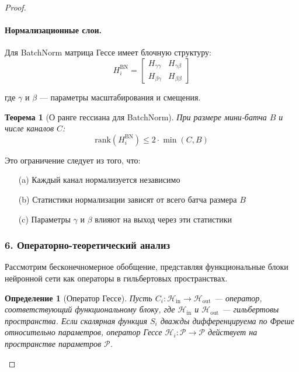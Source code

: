 \documentclass[a4paper,12pt]{article}
\newtheorem{theorem}{Теорема}
\newtheorem{definition}{Определение}
\begin{document}
\begin{proof}
    \paragraph{Нормализационные слои.}
    Для BatchNorm матрица Гессе имеет блочную структуру:
    \begin{equation}
    H_i^{\text{BN}} = 
    \begin{bmatrix}
    H_{\gamma\gamma} & H_{\gamma\beta} \\
    H_{\beta\gamma} & H_{\beta\beta}
    \end{bmatrix}
    \end{equation}
    
    где $\gamma$ и $\beta$ — параметры масштабирования и смещения.
    
    \begin{theorem}[О ранге гессиана для BatchNorm]
    При размере мини-батча $B$ и числе каналов $C$:
    \begin{equation}
    \text{rank}(H_i^{\text{BN}}) \leq 2 \cdot \min(C, B)
    \end{equation}
    \end{theorem}
    
    Это ограничение следует из того, что:
    \begin{enumerate}
    \item[(a)] Каждый канал нормализуется независимо
    \item[(b)] Статистики нормализации зависят от всего батча размера $B$
    \item[(c)] Параметры $\gamma$ и $\beta$ влияют на выход через эти статистики
    \end{enumerate}
    
    \subsubsection*{6. Операторно-теоретический анализ}
    
    Рассмотрим бесконечномерное обобщение, представляя функциональные блоки нейронной сети как операторы в гильбертовых пространствах.
    
    \begin{definition}[Оператор Гессе]
    Пусть $C_i: \mathcal{H}_{\text{in}} \rightarrow \mathcal{H}_{\text{out}}$ — оператор, соответствующий функциональному блоку, где $\mathcal{H}_{\text{in}}$ и $\mathcal{H}_{\text{out}}$ — гильбертовы пространства. Если скалярная функция $S_i$ дважды дифференцируема по Фреше относительно параметров, оператор Гессе $\mathcal{H}_i: \mathcal{P} \rightarrow \mathcal{P}$ действует на пространстве параметров $\mathcal{P}$.
    \end{definition}
    

\end{proof}
\end{document}
